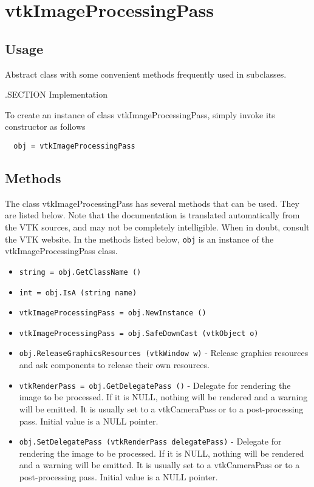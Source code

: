 \section{vtkImageProcessingPass}

\subsection{Usage}

 Abstract class with some convenient methods frequently used in subclasses.

 .SECTION Implementation

To create an instance of class vtkImageProcessingPass, simply
invoke its constructor as follows
\begin{verbatim}
  obj = vtkImageProcessingPass
\end{verbatim}
\subsection{Methods}

The class vtkImageProcessingPass has several methods that can be used.
  They are listed below.
Note that the documentation is translated automatically from the VTK sources,
and may not be completely intelligible.  When in doubt, consult the VTK website.
In the methods listed below, \verb|obj| is an instance of the vtkImageProcessingPass class.
\begin{itemize}
\item  \verb|string = obj.GetClassName ()|

\item  \verb|int = obj.IsA (string name)|

\item  \verb|vtkImageProcessingPass = obj.NewInstance ()|

\item  \verb|vtkImageProcessingPass = obj.SafeDownCast (vtkObject o)|

\item  \verb|obj.ReleaseGraphicsResources (vtkWindow w)| -  Release graphics resources and ask components to release their own
 resources.
 

\item  \verb|vtkRenderPass = obj.GetDelegatePass ()| -  Delegate for rendering the image to be processed.
 If it is NULL, nothing will be rendered and a warning will be emitted.
 It is usually set to a vtkCameraPass or to a post-processing pass.
 Initial value is a NULL pointer.

\item  \verb|obj.SetDelegatePass (vtkRenderPass delegatePass)| -  Delegate for rendering the image to be processed.
 If it is NULL, nothing will be rendered and a warning will be emitted.
 It is usually set to a vtkCameraPass or to a post-processing pass.
 Initial value is a NULL pointer.

\end{itemize}
